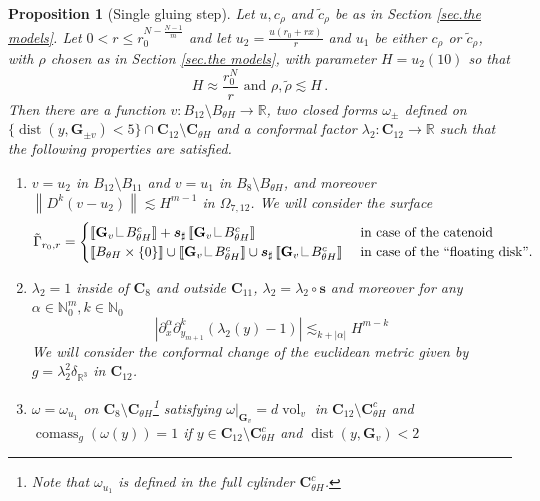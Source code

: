 \documentclass[reqno]{amsart}
\newtheorem{proposition}[theorem]{Proposition}
\theoremstyle{definition}
\theoremstyle{remark}
\numberwithin{equation}{section}
\newcommand{\norm}[1]{\left\lVert#1\right\rVert}
\newcommand{\R}{\mathbb{R}}
\newcommand{\N}{\mathbb{N}}
\DeclareMathOperator{\dist}{dist}
\newcommand\res{\mathop{\hbox{\vrule height 7pt width .3pt depth 0pt\vrule height .3pt width 5pt depth 0pt}}\nolimits}
\newcommand{\bC}{\mathbf{C}} %
\newcommand{\bG}{\mathbf{G}} %
\def\a#1{\left\llbracket{#1}\right\rrbracket}
\begin{document}
\begin{proposition}[Single gluing step]\label{prop:single gluing} Let $u, c_\rho$ and $\tilde{c}_\rho$ be as in Section \ref{sec.the models}. Let $0<r\leq r_0^{N-\frac{N-1}{m}}$ and let $u_2=\frac{u(r_0+rx)}{r}$ and $u_1$ be either $c_\rho$ or $\tilde{c}_\rho$, with $\rho$ chosen as in Section \ref{sec.the models}, with parameter $H=u_2(10)$ so that 
    \[ H \approx \frac{r_0^N}{r} \text{ and } \rho,\tilde{\rho} \lesssim  H\,.\]
Then there are a function $v\colon B_{12}\setminus B_{\theta H}\to \R$, two closed forms $\omega_\pm$ defined on $\{\dist(y,\bG_{\pm v})<5\}\cap \bC_{12}\setminus \bC_{\theta H}$ and a conformal factor $\lambda_2\colon \bC_{12}\to \R$ such that the following properties are satisfied.
\begin{enumerate}[label=(G.\arabic*)]
    \item\label{list.properties of v} $v=u_2$ in $B_{12}\setminus B_{11}$ and $v=u_1$ in $B_8\setminus B_{\theta H}$, and moreover 
     $\norm{D^k(v-u_2)} \lesssim H^{m-1}$ in $\Omega_{7,12}$. We will consider the surface
     \begin{align*}
    \tilde{\Gamma}_{r_0,r}=\begin{cases}  \a{\bG_{v}\res B_{\theta H}^c} + \boldsymbol{s}_\sharp\a{\bG_{v}\res B_{\theta H}^c} &\text{ in case of the catenoid }\\
    \a{B_{\theta H}\times \{0\}} \cup \a{\bG_{v}\res B_{\theta H}^c} \cup \boldsymbol{s}_\sharp\a{\bG_{v}\res B_{\theta H}^c} &\text{ in case of the ``floating disk''}.
    \end{cases}
\end{align*}
    \item\label{list.properties of lambda} $\lambda_2=1$ inside of $\bC_{8}$ and outside $\bC_{11}$, $\lambda_2=\lambda_2\circ \boldsymbol{s}$ and moreover for any $\alpha\in \N_0^m, k\in \N_0$ \[|\partial_x^\alpha \partial_{y_{m+1}}^k(\lambda_2(y)-1)| \lesssim_{k+|\alpha|} H^{m-k} \]
    We will consider the conformal change of the euclidean metric given by $g=\lambda_2^2 \delta_{\R^3}$ in $\bC_{12}$.
    \item\label{list.properties of omega} $\omega=\omega_{u_1}$ on $\bC_8\setminus \bC_{\theta H}$\footnote{Note that $\omega_{u_1}$ is defined in the full cylinder $\bC_{\theta H}^c$.} satisfying $\omega|_{\bG_{v}} = d\operatorname{vol}_{v}$ in  $\bC_{12}\setminus \bC_{\theta H}^c$ and $\operatorname{comass}_g(\omega(y))=1$ if $y \in \bC_{12}\setminus \bC_{\theta H}^c$  and $\dist(y,\bG_{ v})< 2$
\end{enumerate}
\end{proposition}
\end{document}

